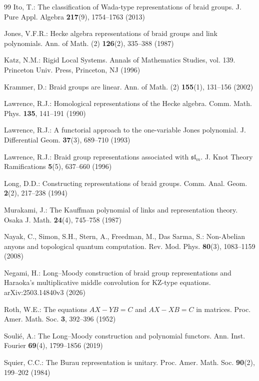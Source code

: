 \documentclass[11pt]{article}
\theoremstyle{definition}
\theoremstyle{remark}
\begin{document}
\begin{thebibliography}{99}
Ito, T.: The classification of Wada-type representations of braid groups.
J. Pure Appl. Algebra \textbf{217}(9), 1754--1763 (2013)

Jones, V.F.R.: Hecke algebra representations of braid groups and link
polynomials. Ann. of Math. (2) \textbf{126}(2), 335--388 (1987)

Katz, N.M.: Rigid Local Systems. Annals of Mathematics Studies, vol. 139.
Princeton Univ. Press, Princeton, NJ (1996)

Krammer, D.: Braid groups are linear. Ann. of Math. (2) \textbf{155}(1),
131--156 (2002)

Lawrence, R.J.: Homological representations of the Hecke algebra. Comm.
Math. Phys. \textbf{135}, 141--191 (1990)

Lawrence, R.J.: A functorial approach to the one-variable Jones
polynomial. J. Differential Geom. \textbf{37}(3), 689--710 (1993)

Lawrence, R.J.: Braid group representations associated with
$\mathfrak{sl}_m$. J. Knot Theory Ramifications \textbf{5}(5), 637--660
(1996)

Long, D.D.: Constructing representations of braid groups. Comm. Anal.
Geom. \textbf{2}(2), 217--238 (1994)

Murakami, J.: The Kauffman polynomial of links and representation theory.
Osaka J. Math. \textbf{24}(4), 745--758 (1987)

Nayak, C., Simon, S.H., Stern, A., Freedman, M., Das Sarma, S.:
Non-Abelian anyons and topological quantum computation. Rev. Mod. Phys.
\textbf{80}(3), 1083--1159 (2008)

Negami, H.: Long--Moody construction of braid group representations and
Haraoka's multiplicative middle convolution for KZ-type equations.
arXiv:2503.14840v3 (2026)

Roth, W.E.: The equations $AX - YB = C$ and $AX - XB = C$ in matrices.
Proc. Amer. Math. Soc. \textbf{3}, 392--396 (1952)

Souli\'e, A.: The Long--Moody construction and polynomial functors. Ann.
Inst. Fourier \textbf{69}(4), 1799--1856 (2019)

Squier, C.C.: The Burau representation is unitary. Proc. Amer. Math. Soc.
\textbf{90}(2), 199--202 (1984)


\end{thebibliography}
\end{document}
